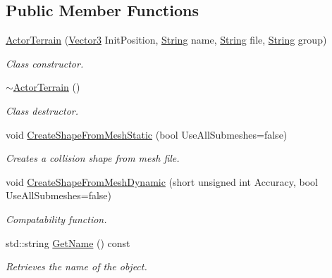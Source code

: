 \subsection*{Public Member Functions}
\begin{DoxyCompactItemize}
\item 
\hyperlink{classphys_1_1ActorTerrain_af0d3b88d5ee409c5451bb13a20254176}{ActorTerrain} (\hyperlink{classphys_1_1Vector3}{Vector3} InitPosition, \hyperlink{namespacephys_aa03900411993de7fbfec4789bc1d392e}{String} name, \hyperlink{namespacephys_aa03900411993de7fbfec4789bc1d392e}{String} file, \hyperlink{namespacephys_aa03900411993de7fbfec4789bc1d392e}{String} group)
\begin{DoxyCompactList}\small\item\em Class constructor. \item\end{DoxyCompactList}\item 
\hyperlink{classphys_1_1ActorTerrain_af6ef2e3694b7afe0b59cfa0909c0490c}{$\sim$ActorTerrain} ()
\begin{DoxyCompactList}\small\item\em Class destructor. \item\end{DoxyCompactList}\item 
void \hyperlink{classphys_1_1ActorTerrain_aaed245d7af66230aaabb02a84e891bb0}{CreateShapeFromMeshStatic} (bool UseAllSubmeshes=false)
\begin{DoxyCompactList}\small\item\em Creates a collision shape from mesh file. \item\end{DoxyCompactList}\item 
void \hyperlink{classphys_1_1ActorTerrain_a9fed38501411c0cf7a1e9f4f36af6ac7}{CreateShapeFromMeshDynamic} (short unsigned int Accuracy, bool UseAllSubmeshes=false)
\begin{DoxyCompactList}\small\item\em Compatability function. \item\end{DoxyCompactList}\item 
std::string \hyperlink{classphys_1_1ActorTerrain_a08f306ae189e55d780dcaa2c43d7b6eb}{GetName} () const 
\begin{DoxyCompactList}\small\item\em Retrieves the name of the object. \item\end{DoxyCompactList}\item 

\end{DoxyCompactItemize}
